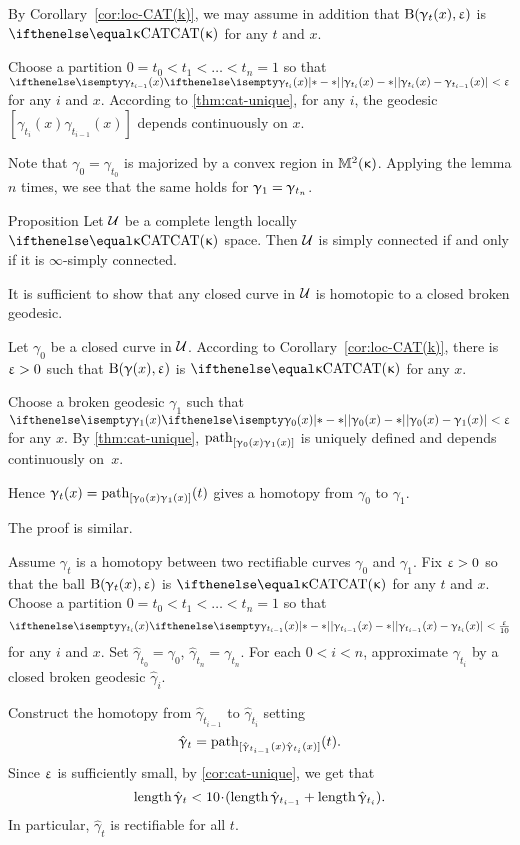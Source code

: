 By Corollary~\ref{cor:loc-CAT(k)},
we may assume in addition that
$\mathrm{B}{}(\upgamma_t(x),\upvarepsilon)$ is $\CAT\kappa$ 
for any $t$ and $x$.

Choose a partition $0=t_0<t_1<\dots<t_n=1$
so that $\dist{\gamma_{t_i}(x)}{\gamma_{t_{i-1}}(x)}{}<\eps$
for any $i$ and $x$.
According to \ref{thm:cat-unique},
for any $i$,
the geodesic $[\gamma_{t_i}(x)\gamma_{t_{i-1}}(x)]$ depends continuously on $x$.

Note that $\gamma_0=\gamma_{t_0}$ is majorized by a convex region in $\mathbb{M}_{{}}^{2}({\upkappa})$.
Applying the lemma $n$ times, we see that the same holds for $\gamma_1\z=\gamma_{t_n}$.
\qeds

\begin{thm}{Proposition}\label{prop:sc}
Let $\mathcal{U}$ be a complete length locally $\CAT\kappa$ space.
Then $\mathcal{U}$ is simply connected if and only if it is $\infty$-simply connected.
\end{thm}

It is sufficient to show that any closed curve in $\mathcal{U}$ is homotopic to a closed broken geodesic.

Let $\gamma_0$ be a closed curve in $\mathcal{U}$.
According to Corollary~\ref{cor:loc-CAT(k)},
there is $\upvarepsilon>0$ such that 
$\mathrm{B}{}(\upgamma(x),\upvarepsilon)$ is $\CAT\kappa$
for any $x$.

Choose a broken geodesic $\gamma_1$ such that $\dist{\gamma_0(x)}{\gamma_1(x)}{}<\eps$ for any $x$.
By \ref{thm:cat-unique}, 
$\mathrm{path}_{[\upgamma_0(x)\upgamma_1(x)]}$ 
is uniquely defined 
and depends continuously on~$x$.

Hence $\upgamma_t(x)=\mathrm{path}_{[\upgamma_0(x)\upgamma_1(x)]}(t)$ gives a homotopy from $\gamma_0$ to $\gamma_1$.

 The proof is similar.

Assume $\gamma_t$ is a homotopy between two rectifiable curves $\gamma_0$ and $\gamma_1$.
Fix $\upvarepsilon>0$ so that the ball $\mathrm{B}{}(\upgamma_t(x),\upvarepsilon)$ is $\CAT\kappa$
for any $t$ and $x$.
Choose a partition $0=t_0<t_1<\dots<t_n=1$ 
so that 
$$\dist{\gamma_{t_{i-1}}(x)}{\gamma_{t_i}(x)}{}<\tfrac\eps{10}$$
for any $i$ and $x$.
Set $\hat\gamma_{t_0}=\gamma_0$, $\hat\gamma_{t_n}=\gamma_{t_n}$.
For each $0<i<n$, approximate $\gamma_{t_i}$ by a closed broken geodesic $\hat\gamma_{i}$.

Construct the homotopy 
from $\hat\gamma_{t_{i-1}}$ 
to $\hat\gamma_{t_i}$ 
setting 
$$\hat{\upgamma}_t
=
\mathrm{path}_{[\hat{\upgamma}_{t_{i-1}}(x)\hat{\upgamma}_{t_i}(x)]}(t).$$
Since $\upvarepsilon$ is sufficiently small, 
by \ref{cor:cat-unique}, we get that
$$\length\hat\gamma_t
<
10\cdot(\length\hat\gamma_{t_{i-1}}+\length\hat\gamma_{t_i}).$$
In particular, $\hat\gamma_t$ is rectifiable for all $t$.


